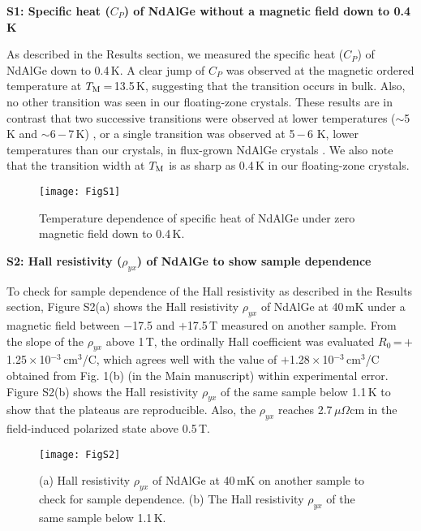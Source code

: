 \documentclass[%
preprint,
 amsmath,amssymb,
 aps,
]{revtex4-2}
\begin{document}
\clearpage

\hspace{-7 mm}
\textbf{S1: Specific heat ($C_{P}$) of NdAlGe without a magnetic field down to 0.4 K}

%
As described in the Results section, we measured the specific heat ($C_{P}$) of NdAlGe down to 0.4\,K. 
%
A clear jump of $C_{P}$ was observed at the magnetic ordered temperature at $T_{\rm M}$\,=\,13.5\,K, 
suggesting that the transition occurs in bulk. 
%
Also, no other transition was seen in our floating-zone crystals. 
%
These results are in contrast that two successive transitions were observed at lower temperatures 
($\sim$5 K and $\sim$6\,$-$\,7\,K) \cite{Yang_PhysRevMater_2023_SM,Dhital_PhyrevB_2023_SM}, 
or a single transition was observed at 5\,$-$\,6 K, 
lower temperatures than our crystals, in flux-grown NdAlGe crystals 
\cite{Zhao_NewJPhys_2022_SM,Cho_SSRN_2022_SM}. 
We also note that the transition width at $T_{\rm M}$ is as sharp as 0.4\,K in our floating-zone crystals. 
%

%
\begin{figure}[h]
\texttt{[image: FigS1]}%
\caption{
Temperature dependence of specific heat of NdAlGe under zero magnetic field down to 0.4\,K. 
}
\end{figure}
%

\clearpage


\hspace{-7 mm}
\textbf{S2: Hall resistivity ($\rho_{yx}$) of NdAlGe to show sample dependence}

%
To check for sample dependence of the Hall resistivity as described in the Results section, 
Figure S2(a) shows the Hall resistivity $\rho_{yx}$ of NdAlGe at 40\,mK under a magnetic field 
between $-$17.5 and $+$17.5\,T measured on another sample. 
%
From the slope of the $\rho_{yx}$ above 1\,T, 
the ordinally Hall coefficient was evaluated $R_{0}$\,=\,$+$1.25\,$\times$\,10$^{-3}$\,cm$^{3}$/C, 
which agrees well with the value of $+$1.28\,$\times$\,10$^{-3}$\,cm$^{3}$/C obtained from Fig. 1(b) 
(in the Main manuscript) within experimental error. 
%
Figure S2(b) shows the Hall resistivity $\rho_{yx}$ of the same sample below 1.1\,K 
to show that the plateaus are reproducible.  
Also, the $\rho_{yx}$ reaches 2.7\,$\mu\Omega$cm in the field-induced polarized state above 0.5\,T.
%

%
\begin{figure}[h]
\texttt{[image: FigS2]}%
\caption{
(a) Hall resistivity $\rho_{yx}$ of NdAlGe at 40\,mK on another sample to check for sample dependence. 
(b) The Hall resistivity $\rho_{yx}$ of the same sample below 1.1\,K.  
}
\end{figure}
%
\end{document}
